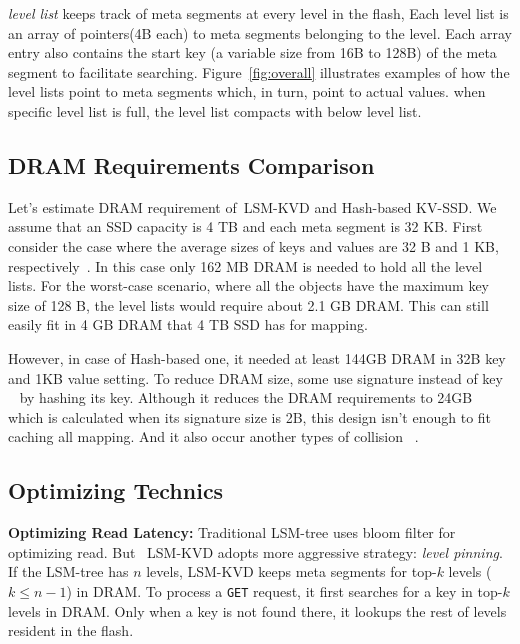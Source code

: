 \documentclass{abstract_hutech}
\newcommand{\ours}{LSM-KVD}
\begin{document}
\textit{level list} keeps track of meta segments at every level in the flash, Each level list is an array of pointers(4B each)
to meta segments belonging to the level. 
Each array entry also contains the start key (a variable size from 16B to 128B) of the meta segment to facilitate searching.
Figure~\ref{fig:overall} illustrates examples of how the level lists point to 
meta segments which, in turn, point to actual values.
when specific level list is full, the level list compacts with below level list.

\vspace{-5pt}
\subsection{DRAM Requirements Comparison}\vspace{-5pt}
Let's estimate DRAM requirement of~\ours{} and Hash-based KV-SSD.
We assume that an SSD capacity is 4 TB and each meta segment is 32 KB.
First consider the case where the average sizes of keys and values are 32 B and 1 KB,
respectively~\cite{kvsize}. In this case only 162 MB DRAM is needed to hold all the level lists.
For the worst-case scenario, where all the objects have the maximum key size of 128 B,
the level lists would require about 2.1 GB DRAM. 
This can still easily fit in 4 GB DRAM that 4 TB SSD has for mapping.

However, in case of Hash-based one, it needed at least 144GB DRAM in 32B key and 1KB value setting.
To reduce DRAM size, some use signature instead of key ~\cite{bluedbm} by hashing its key.
Although it reduces the DRAM requirements to 24GB which is calculated when its signature size is 2B, this design isn't enough to fit caching all mapping.
And it also occur another types of collision ~.


\vspace{-5pt}
\subsection{Optimizing Technics}\vspace{-5pt}
\textbf{Optimizing Read Latency:}
Traditional LSM-tree uses bloom filter for optimizing read. 
But ~\ours{} adopts more aggressive strategy: \textit{level pinning}. 
If the LSM-tree has $n$ levels, \ours{} keeps meta segments for top-$k$ levels ($k \le n-1$) in DRAM.
To process a \texttt{GET} request, it first searches for a key in top-$k$
levels in DRAM.  Only when a key is not found there, it lookups the rest
of levels resident in the flash.
\end{document}
